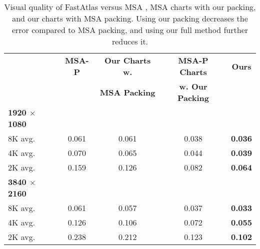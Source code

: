\begin{table}
\scriptsize
\setlength{\tabcolsep}{2pt}
\centering
\begin{tabular}{l|ccc|c}
  & \textbf{MSA-P} & \textbf{Our Charts w.} & \textbf{MSA-P Charts} & \textbf{Ours} \\
  &  & \textbf{MSA Packing} & \textbf{w. Our Packing} & \\
\hline
\textbf{1920 $\times$ 1080} & & & & \\
 8K avg. & 0.061 & 0.061 & 0.038 & \textbf{0.036} \\
 4K avg. & 0.070 & 0.065 & 0.044 & \textbf{0.039} \\
 2K avg. & 0.159 & 0.126 & 0.082 & \textbf{0.064} \\
\hline
\textbf{3840 $\times$ 2160} & & & & \\
 8K avg. & 0.061 & 0.057 & 0.037 & \textbf{0.033} \\
 4K avg. & 0.126 & 0.106 & 0.072 & \textbf{0.055} \\
 2K avg. & 0.238 & 0.212 & 0.123 & \textbf{0.102} \\
\end{tabular}

\vspace{1mm}
\caption{Visual quality of FastAtlas versus MSA \cite{Neff2022MSA}, MSA charts with our packing, and our charts with MSA packing.
Using our packing decreases the error compared to MSA packing, and using our full method further reduces it.}
\label{tab:ablation}
\end{table}
